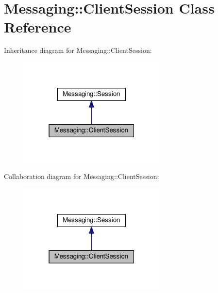 \hypertarget{class_messaging_1_1_client_session}{}\section{Messaging\+:\+:Client\+Session Class Reference}
\label{class_messaging_1_1_client_session}


Inheritance diagram for Messaging\+:\+:Client\+Session\+:
\nopagebreak
\begin{figure}[H]
\begin{center}
\leavevmode
\includegraphics[width=211pt]{class_messaging_1_1_client_session__inherit__graph}
\end{center}
\end{figure}


Collaboration diagram for Messaging\+:\+:Client\+Session\+:
\nopagebreak
\begin{figure}[H]
\begin{center}
\leavevmode
\includegraphics[width=211pt]{class_messaging_1_1_client_session__coll__graph}
\end{center}
\end{figure}
